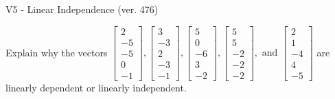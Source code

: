 \begin{exercise}
  \begin{exerciseTitle}V5 - Linear Independence (ver. 476)\end{exerciseTitle}
  \begin{exerciseStatement}
    Explain why the vectors \(\left[\begin{array}{r}
2 \\
-5 \\
-5 \\
0 \\
-1
\end{array}\right] , \left[\begin{array}{r}
3 \\
-3 \\
2 \\
-3 \\
-1
\end{array}\right] , \left[\begin{array}{r}
5 \\
0 \\
-6 \\
3 \\
-2
\end{array}\right] , \left[\begin{array}{r}
5 \\
5 \\
-2 \\
-2 \\
-2
\end{array}\right] , \text{ and } \left[\begin{array}{r}
2 \\
1 \\
-4 \\
4 \\
-5
\end{array}\right]\) are linearly dependent or linearly independent.	



\end{exerciseStatement}
\end{exercise}
